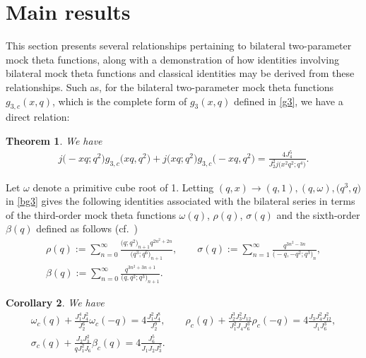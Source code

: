 \documentclass[10pt,a4paper]{amsart}
\numberwithin{equation}{section}
\newtheorem{Theorem}{Theorem}[section]
\newtheorem{Corollary}[Theorem]{Corollary}
\begin{document}
\section{Main results}

This section presents several relationships pertaining to bilateral two-parameter mock theta functions, along with a demonstration of how identities involving bilateral mock theta functions and classical identities may be derived from these relationships. Such as, for the bilateral two-parameter mock theta functions $g_{3,c}(x,q)$, which is the complete form of $g_3(x,q)$ defined in \eqref{g3}, we have a direct relation:

\begin{Theorem}\label{bg3-1}
We have
\begin{align} \label{bg3}
j\bigl(-xq;q^2\bigr)g_{3,c}\bigl(xq,q^2\bigr)+j\bigl(xq;q^2\bigr)g_{3,c}\bigl(-xq,q^2\bigr)=\frac{4J_4^5}{J_2^2j\bigl(x^2q^2;q^4\bigr)}.
\end{align}
\end{Theorem}

Let $\omega$ denote a primitive cube root of 1. Letting $(q,x)\rightarrow(q,1), (q,\omega), \bigl(q^3,q\bigr)$ in \eqref{bg3} gives the following identities associated with the bilateral series in terms of the third-order mock theta functions $\omega(q)$, $\rho(q)$, $\sigma(q)$ and the sixth-order $\beta(q)$ defined as follows (cf.\ \cite{GM1,GM,R})
\begin{gather*}
\rho(q):=\sum_{n=0}^{\infty}\frac{\bigl(q;q^2\bigr)_{n+1}q^{2n^2+2n}}{\bigl(q^3;q^6\bigr)_{n+1}},\qquad
\sigma(q):=\sum_{n=1}^{\infty}\frac{q^{3n^2-3n}}{\bigl(-q,-q^2;q^3\bigr)_n},\\
 \beta(q):=\sum_{n=0}^{\infty}\frac{q^{3n^2+3n+1}}{\bigl(q,q^2;q^3\bigr)_{n+1}}.
\end{gather*}
\begin{Corollary} \label{coro1}
We have
\begin{gather*}
\omega_c(q)+\frac{J_1^4J_4^2}{J_2^6}\omega_c(-q)=4\frac{J_1^2J_4^8}{J_2^9},\qquad
\rho_c(q)+\frac{J_2^3J_3^2J_{12}}{J_1^2J_4J_6^3}\rho_c(-q)=4\frac{J_3J_4^2J_{12}^2}{J_1J_6^3},\\
\sigma_c(q)+\frac{J_2J_3^2}{qJ_1^2J_6}\beta_c(q)=4\frac{J_6^5}{J_1J_2J_3^2}.
\end{gather*}
\end{Corollary}
\end{document}
